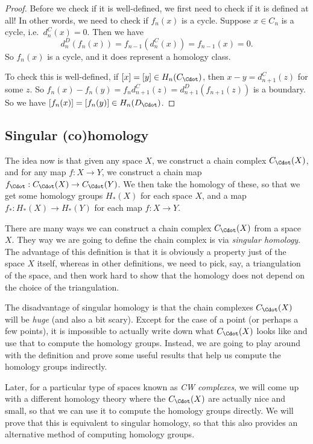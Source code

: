 \documentclass[a4paper]{article}
\theoremstyle{definition}
\begin{document}
\begin{proof}
  Before we check if it is well-defined, we first need to check if it is defined at all! In other words, we need to check if $f_n(x)$ is a cycle. Suppose $x \in C_n$ is a cycle, i.e.\ $d_n^C(x) = 0$. Then we have
  \[
    d_n^D(f_n(x)) = f_{n - 1}(d_n^C(x)) = f_{n - 1}(x) = 0.
  \]
  So $f_n(x)$ is a cycle, and it does represent a homology class.

  To check this is well-defined, if $[x] = [y] \in H_n(C_{\Cdot})$, then $x - y = d_{n + 1}^C(z)$ for some $z$. So $f_n(x) - f_n(y) = f_n d_{n + 1}^C(z) = d_{n + 1}^D (f_{n + 1}(z))$ is a boundary. So we have $[f_n(x)] = [f_n(y)] \in H_n(D_{\Cdot})$.
\end{proof}

\subsection{Singular (co)homology}
The idea now is that given any space $X$, we construct a chain complex $C_\Cdot(X)$, and for any map $f: X \to Y$, we construct a chain map $f_\Cdot: C_\Cdot(X) \to C_\Cdot(Y)$. We then take the homology of these, so that we get some homology groups $H_*(X)$ for each space $X$, and a map $f_*: H_*(X) \to H_*(Y)$ for each map $f: X \to Y$.

There are many ways we can construct a chain complex $C_\Cdot(X)$ from a space $X$. They way we are going to define the chain complex is via \emph{singular homology}. The advantage of this definition is that it is obviously a property just of the space $X$ itself, whereas in other definitions, we need to pick, say, a triangulation of the space, and then work hard to show that the homology does not depend on the choice of the triangulation.

The disadvantage of singular homology is that the chain complexes $C_\Cdot(X)$ will be \emph{huge} (and also a bit scary). Except for the case of a point (or perhaps a few points), it is impossible to actually write down what $C_\Cdot(X)$ looks like and use that to compute the homology groups. Instead, we are going to play around with the definition and prove some useful results that help us compute the homology groups indirectly.

Later, for a particular type of spaces known as \emph{CW complexes}, we will come up with a different homology theory where the $C_{\Cdot}(X)$ are actually nice and small, so that we can use it to compute the homology groups directly. We will prove that this is equivalent to singular homology, so that this also provides an alternative method of computing homology groups.
\end{document}
